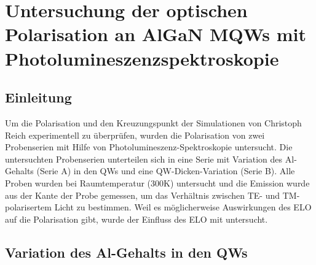 \thispagestyle{fancy}

\chapter{Untersuchung der optischen Polarisation an AlGaN MQWs mit Photolumineszenzspektroskopie}
\label{chap:pol}
\section{Einleitung}
Um die Polarisation und den Kreuzungspunkt der Simulationen von Christoph Reich experimentell zu \"uberpr\"ufen, wurden die Polarisation von zwei Probenserien mit Hilfe von Photolumineszenz-Spektroskopie untersucht. Die untersuchten Probenserien unterteilen sich in eine Serie mit Variation des Al-Gehalts (Serie A) in den QWs und eine QW-Dicken-Variation (Serie B).
Alle Proben wurden bei Raumtemperatur (300K) untersucht und die Emission wurde aus der Kante der Probe gemessen, um das Verhältnis zwischen TE- und TM-polarisertem Licht zu bestimmen. Weil es m\"oglicherweise Auswirkungen des ELO auf die Polarisation gibt, wurde der Einfluss des ELO mit untersucht. 

\section{Variation des Al-Gehalts in den QWs}

